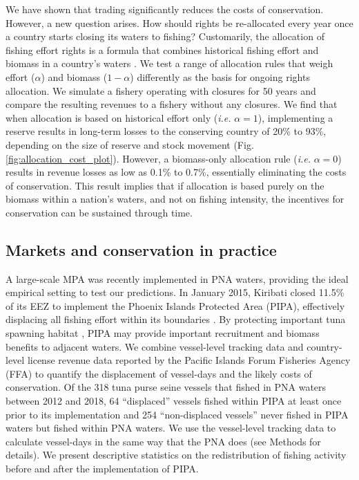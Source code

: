\documentclass[12pt]{article}
\begin{document}
We have shown that trading significantly reduces the costs of conservation. However, a new question arises. How should rights be re-allocated every year once a country starts closing its waters to fishing? Customarily, the allocation of fishing effort rights is a formula that combines historical fishing effort and biomass in a country's waters \cite{havice_2013}. We test a range of allocation rules that weigh effort ($\alpha$) and biomass ($1 - \alpha$) differently as the basis for ongoing rights allocation. We simulate a fishery operating with closures for 50 years and compare the resulting revenues to a fishery without any closures. We find that when allocation is based on historical effort only (\emph{i.e.} $\alpha = 1$), implementing a reserve results in long-term losses to the conserving country of 20\% to 93\%, depending on the size of reserve and stock movement (Fig. \ref{fig:allocation_cost_plot}). However, a biomass-only allocation rule (\emph{i.e.} $\alpha = 0$) results in revenue losses as low as 0.1\% to 0.7\%, essentially eliminating the costs of conservation. This result implies that if allocation is based purely on the biomass within a nation's waters, and not on fishing intensity, the incentives for conservation can be sustained through time.

\subsection{Markets and conservation in practice}

A large-scale MPA was recently implemented in PNA waters, providing the ideal empirical setting to test our predictions. In January 2015, Kiribati closed 11.5\% of its EEZ to implement the Phoenix Islands Protected Area (PIPA), effectively displacing all fishing effort within its boundaries \cite{mccauley_2016,mcdermott_2018}. By protecting important tuna spawning habitat \cite{hernndez_2019}, PIPA may provide important recruitment and biomass benefits to adjacent waters. We combine vessel-level tracking data \cite{kroodsma_2018} and country-level license revenue data reported by the Pacific Islands Forum Fisheries Agency (FFA) \cite{ffa_2017} to quantify the displacement of vessel-days and the likely costs of conservation. Of the 318 tuna purse seine vessels that fished in PNA waters between 2012 and 2018, 64 ``displaced'' vessels fished within PIPA at least once prior to its implementation and 254 ``non-displaced vessels'' never fished in PIPA waters but fished within PNA waters. We use the vessel-level tracking data to calculate vessel-days in the same way that the PNA does (see Methods for details). We present descriptive statistics on the redistribution of fishing activity before and after the implementation of PIPA.
\end{document}

